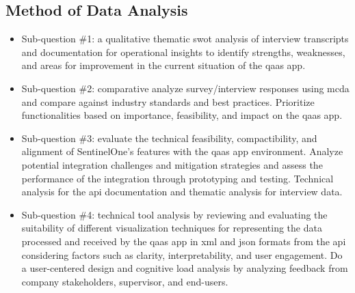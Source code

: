 \subsection{Method of Data Analysis}
\begin{itemize}[label=-]
      \item Sub-question \#1: a qualitative thematic \acrshort{swot} analysis of interview transcripts
            and documentation for operational insights to identify strengths, weaknesses, and areas for
            improvement in the current situation of the \acrshort{qaas} app.
      \item Sub-question \#2: comparative analyze survey/interview responses using \acrshort{mcda} and
            compare against industry standards and best practices. Prioritize functionalities based on
            importance, feasibility, and impact on the \acrshort{qaas} app.
      \item Sub-question \#3: evaluate the technical feasibility, compactibility, and alignment of
            SentinelOne's features with the \acrshort{qaas} app environment. Analyze potential integration
            challenges and mitigation strategies and assess the performance of the integration through
            prototyping and testing. Technical analysis for the \acrshort{api} documentation and
            thematic analysis for interview data.
      \item Sub-question \#4: technical tool analysis by reviewing and evaluating the suitability of different
            visualization techniques for representing the data processed and received by the \acrshort{qaas}
            app in \acrshort{xml} and \acrshort{json} formats from the \acrshort{api} considering factors such
            as clarity, interpretability, and user engagement. Do a user-centered design and cognitive load
            analysis by analyzing feedback from company stakeholders, supervisor, and end-users.
\end{itemize}
